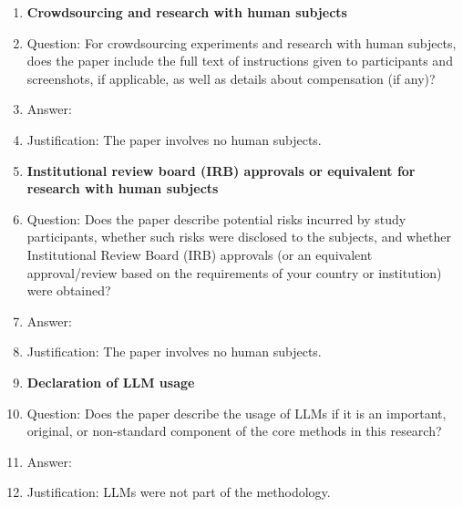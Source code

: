 \begin{enumerate}
\item {\bf Crowdsourcing and research with human subjects}
    \item[] Question: For crowdsourcing experiments and research with human subjects, does the paper include the full text of instructions given to participants and screenshots, if applicable, as well as details about compensation (if any)?
    \item[] Answer: \answerNA{}
    \item[] Justification: The paper involves no human subjects.

\item {\bf Institutional review board (IRB) approvals or equivalent for research with human subjects}
    \item[] Question: Does the paper describe potential risks incurred by study participants, whether such risks were disclosed to the subjects, and whether Institutional Review Board (IRB) approvals (or an equivalent approval/review based on the requirements of your country or institution) were obtained?
    \item[] Answer: \answerNA{}
    \item[] Justification: The paper involves no human subjects.

\item {\bf Declaration of LLM usage}
    \item[] Question: Does the paper describe the usage of LLMs if it is an important, original, or non-standard component of the core methods in this research?
    \item[] Answer: \answerNA{}
    \item[] Justification: LLMs were not part of the methodology.

\end{enumerate}
